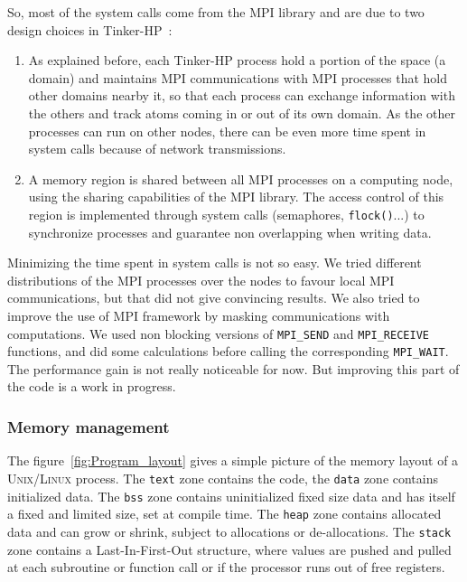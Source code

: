 \documentclass[9pt,comparison]{livecoms}
\newcommand{\lv}{\Large\verb}
\begin{document}
 So, most of the system calls come from the \textsc{MPI} library and are due to two design choices in Tinker-HP~:
\begin{enumerate}
    \item As explained before, each Tinker-HP process hold a portion of the space (a domain) and maintains MPI communications with MPI processes that hold other domains nearby it, so that each process can exchange information  with the others and track atoms coming in or out of its own domain. As the other processes can run on other nodes, there can be even more time spent in system calls because of network transmissions. 
    \item A memory region is shared between all MPI processes on a computing node, using the sharing capabilities of the MPI library. The access control of this region is implemented through system calls (semaphores, {\color{codegreen}\lv|flock()|}...) to synchronize processes and guarantee non overlapping when writing data.
\end{enumerate}

Minimizing the time spent in system calls is not so easy. We tried different distributions of the MPI processes over the nodes to favour local MPI communications, but that did not give convincing results. We also tried to improve the use of MPI framework by masking communications with computations. We used non blocking versions of {\color{blue}\lv|MPI_SEND|} and {\color{blue}\lv|MPI_RECEIVE|} functions, and did some calculations before calling the corresponding {\color{blue}\lv|MPI_WAIT|}. The performance gain is not really noticeable for now. But improving this part of the code is a work in progress.
\subsubsection{Memory management}
\hspace{\parindent}The figure~\ref{fig:Program_layout} gives a simple picture of the memory layout of a \textsc{Unix/Linux} process. The {\color{codepurple}\lv|text|} zone contains the code, the {\color{codepurple}\lv|data|} zone contains initialized data.  The {\color{codepurple}\lv|bss|} zone contains uninitialized fixed size data and has itself a fixed and limited size, set at compile time. The {\color{codepurple}\lv|heap|} zone contains allocated data and can grow or shrink, subject to allocations or de-allocations. The {\color{codepurple}\lv|stack|} zone contains a Last-In-First-Out structure, where values are pushed and pulled at each subroutine or function call or if the processor runs out of free registers.
\end{document}
